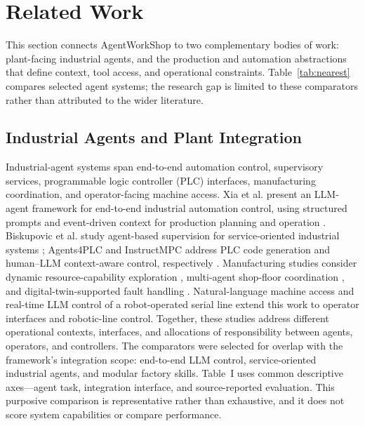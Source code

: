 \section{Related Work}
\label{sec:related}
This section connects AgentWorkShop to two complementary bodies of work:
plant-facing industrial agents, and the production and automation abstractions
that define context, tool access, and operational constraints. Table~\ref{tab:nearest}
compares selected agent systems; the research gap is limited to these
comparators rather than attributed to the wider literature.

\subsection{Industrial Agents and Plant Integration}
Industrial-agent systems span end-to-end automation control, supervisory
services, programmable logic controller (PLC) interfaces, manufacturing
coordination, and operator-facing machine access. Xia et al. present an
LLM-agent framework for end-to-end industrial automation control, using
structured prompts and event-driven context for production planning and
operation \cite{xia2025control}. Biskupovic et al. study agent-based supervision for
service-oriented industrial systems \cite{biskupovic2025supervision};
Agents4PLC and InstructMPC address PLC code generation and human--LLM
context-aware control, respectively
\cite{liu2026agents4plc,wu2025instructmpc}. Manufacturing studies consider
dynamic resource-capability exploration \cite{lim2025llmenabled}, multi-agent
shop-floor coordination \cite{zhao2026shopfloor}, and digital-twin-supported
fault handling \cite{gill2025llmdt}. Natural-language machine access
\cite{hofmann2025nlc} and real-time LLM control of a robot-operated serial
line \cite{waseem2026pretrained} extend this work to operator interfaces and
robotic-line control. Together, these studies address different operational
contexts, interfaces, and allocations of responsibility between agents,
operators, and controllers.
The comparators were selected for overlap with the framework's integration
scope: end-to-end LLM control, service-oriented industrial agents, and
modular factory skills. Table~I uses common descriptive axes---agent task,
integration interface, and source-reported evaluation. This purposive
comparison is representative rather than exhaustive, and it does not score
system capabilities or compare performance.

